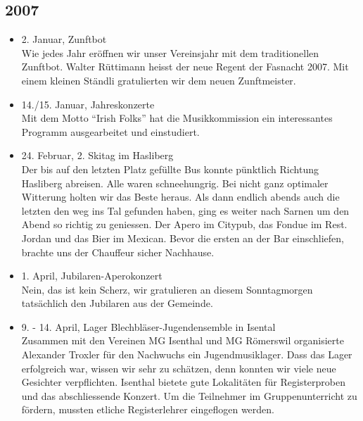 \subsection*{2007}

\begin{history}


    \begin{itemize}

        \item 2. Januar, Zunftbot\\
              Wie jedes Jahr eröffnen wir unser Vereinsjahr mit dem traditionellen
              Zunftbot. Walter Rüttimann heisst der neue Regent der Fasnacht 2007. Mit
              einem kleinen Ständli gratulierten wir dem neuen Zunftmeister.

        \item 14./15. Januar, Jahreskonzerte\\
              Mit dem Motto \enquote{Irish Folks} hat die Musikkommission ein
              interessantes Programm ausgearbeitet und einstudiert.

        \item 24. Februar, 2. Skitag im Hasliberg\\
              Der bis auf den letzten Platz gefüllte Bus konnte pünktlich Richtung
              Hasliberg abreisen. Alle waren schneehungrig. Bei nicht ganz optimaler
              Witterung holten wir das Beste heraus. Als dann endlich abends auch die
              letzten den weg ins Tal gefunden haben, ging es weiter nach Sarnen um
              den Abend so richtig zu geniessen. Der Apero im Citypub, das Fondue im
              Rest. Jordan und das Bier im Mexican. Bevor die ersten an der Bar
              einschliefen, brachte uns der Chauffeur sicher Nachhause.

        \item 1. April, Jubilaren-Aperokonzert\\
              Nein, das ist kein Scherz, wir gratulieren an diesem Sonntagmorgen
              tatsächlich den Jubilaren aus der Gemeinde.

        \item 9. - 14. April, Lager Blechbläser-Jugendensemble in Isental\\
              Zusammen mit den Vereinen MG Isenthal und MG Römerswil organisierte
              Alexander Troxler für den Nachwuchs ein Jugendmusiklager. Dass das Lager
              erfolgreich war, wissen wir sehr zu schätzen, denn konnten wir viele
              neue Gesichter verpflichten. Isenthal bietete gute Lokalitäten für
              Registerproben und das abschliessende Konzert. Um die Teilnehmer im
              Gruppenunterricht zu fördern, mussten etliche Registerlehrer eingeflogen
              werden.


\end{itemize}
\end{history}
